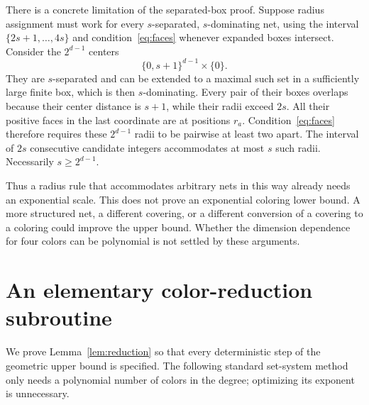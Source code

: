 \documentclass[11pt]{article}
\theoremstyle{definition}\newtheorem{definition}[theorem]{Definition}
\theoremstyle{remark}\newtheorem{remark}[theorem]{Remark}
\begin{document}
There is a concrete limitation of the separated-box proof.
Suppose radius assignment must work for every $s$-separated,
$s$-dominating net, using the interval
$\{2s+1,\ldots,4s\}$ and condition~\eqref{eq:faces} whenever
expanded boxes intersect. Consider the $2^{d-1}$ centers
\[
                         \{0,s+1\}^{d-1}\times\{0\}.
\]
They are $s$-separated and can be extended to a maximal such
set in a sufficiently large finite box, which is then
$s$-dominating. Every pair of their boxes overlaps because
their center distance is $s+1$, while their radii exceed $2s$.
All their positive faces in the last coordinate are at positions
$r_a$. Condition~\eqref{eq:faces} therefore requires these
$2^{d-1}$ radii to be pairwise at least two apart. The interval
of $2s$ consecutive candidate integers accommodates at most
$s$ such radii. Necessarily $s\ge2^{d-1}$.

Thus a radius rule that accommodates arbitrary nets in this
way already needs an exponential scale. This does not prove
an exponential coloring lower bound. A more structured net,
a different covering, or a different conversion of a covering
to a coloring could improve the upper bound. Whether the
dimension dependence for four colors can be polynomial is
not settled by these arguments.

\appendix
\section{An elementary color-reduction subroutine}\label{app:reduction}

We prove Lemma~\ref{lem:reduction} so that every deterministic
step of the geometric upper bound is specified. The following
standard set-system method only needs a polynomial number of
colors in the degree; optimizing its exponent is unnecessary.
\end{document}
